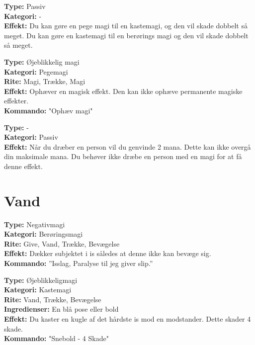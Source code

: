 \begin{primærMagi*}
\textbf{Type:} Passiv\\
\textbf{Kategori:} -\\
\textbf{Effekt:} Du kan gøre en pege magi til en kastemagi, og den vil skade dobbelt så meget. Du kan gøre en kastemagi til en berørings magi og den vil skade dobbelt så meget.\\
\end{primærMagi*}

\begin{primærMagi*}
\textbf{Type:} Øjeblikkelig magi\\
\textbf{Kategori:} Pegemagi\\
\textbf{Rite:} Magi, Trække, Magi\\
\textbf{Effekt:} Ophæver en magisk effekt. Den kan ikke ophæve permanente magiske effekter.\\ 
\textbf{Kommando:} "Ophæv magi"
\end{primærMagi*}

\begin{primærMagi*}
\textbf{Type:} -\\
\textbf{Kategori:} Passiv\\
\textbf{Effekt:} Når du dræber en person vil du genvinde 2 mana. Dette kan ikke overgå din maksimale mana. Du behøver ikke dræbe en person med en magi for at få denne effekt.
\end{primærMagi*}

\section{Vand}
\begin{vand*}[Isslag]
\textbf{Type:} Negativmagi\\
\textbf{Kategori:} Berøringsmagi\\
\textbf{Rite:} Give, Vand, Trække, Bevægelse\\
\textbf{Effekt:} Dækker subjektet i is således at denne ikke kan bevæge sig.\\
\textbf{Kommando:} ”Isslag, Paralyse til jeg giver slip.”
\end{vand*}

\begin{vand*}[Snebold]
\textbf{Type:} Øjeblikkeligmagi\\
\textbf{Kategori:} Kastemagi\\
\textbf{Rite:} Vand, Trække, Bevægelse\\
\textbf{Ingredienser:} En blå pose eller bold\\
\textbf{Effekt:} Du kaster en kugle af det hårdste is mod en modstander. Dette skader 4 skade. \\
\textbf{Kommando:} "Snebold - 4 Skade"
\end{vand*}

